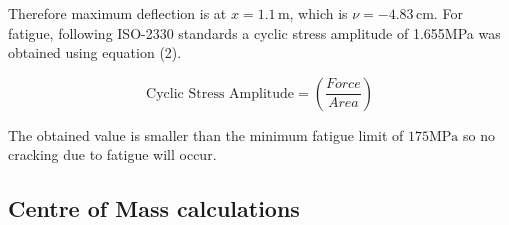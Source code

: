 \documentclass[12pt]{article}
\begin{document}
Therefore maximum deflection is at \(x = 1.1 \, \text{m}\), which is \(\nu = -4.83 \, \text{cm}\).
For fatigue, following ISO-2330 standards a cyclic stress amplitude of 1.655MPa was obtained using equation (2).

\vspace{-20pt}
\begin{equation}
   \text{Cyclic Stress Amplitude} = \left (\frac{Force}{Area} \right)
\end{equation}
\vspace{-20pt}

The obtained value is smaller than the minimum fatigue limit of \(175 \text{MPa}\) so no cracking due to fatigue will occur.


\subsection{Centre of Mass calculations}
\end{document}
